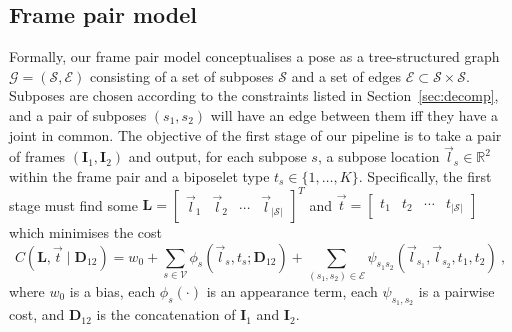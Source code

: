 \documentclass[runningheads]{llncs}
\newcommand{\mat}{\mathbf}
\begin{document}

\subsection{Frame pair model}

Formally, our frame pair model conceptualises a pose as a tree-structured graph
$\mathcal G = (\mathcal S, \mathcal E)$ consisting of a set of subposes
$\mathcal S$ and a set of edges $\mathcal E \subset \mathcal S \times \mathcal
S$. Subposes are chosen according to the constraints listed in
Section~\ref{sec:decomp}, and a pair of subposes $(s_1, s_2)$ will have an edge
between them iff they have a joint in common. The objective of the first stage
of our pipeline is to take a pair of frames $(\mat I_1, \mat I_2)$ and output,
for each subpose $s$, a subpose location $\vec l_s \in \mathbb R^2$ within the
frame pair and a biposelet type $t_s \in \{1, \ldots, K\}$. Specifically, the
first stage must find some $\mat L = \begin{bmatrix}\vec l_1 & \vec l_2 & \cdots
& \vec l_{|\mathcal S|}\end{bmatrix}^T$ and $\vec t = \begin{bmatrix}t_1 & t_2 &
\cdots & t_{|\mathcal S|}\end{bmatrix}$ which minimises the cost
%
\begin{equation}\label{eqn:full-cost}
C(\mat L, \vec t \mid \mat D_{12})
= w_0 + \sum_{s \in \mathcal V} \phi_s(\vec l_s, t_s; \mat D_{12})
+ \sum_{(s_1, s_2) \in \mathcal E}
    \psi_{s_1 s_2}(\vec l_{s_1}, \vec l_{s_2}, t_1, t_2)~,
\end{equation}
%
where $w_0$ is a bias, each $\phi_s(\cdot)$ is an appearance term, each
$\psi_{s_1,s_2}$ is a pairwise cost, and $\mat D_{12}$ is the concatenation
of $\mat I_1$ and $\mat I_2$.
\end{document}
